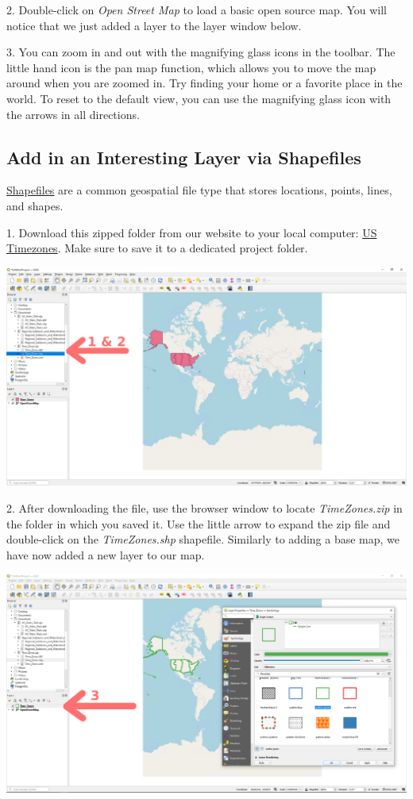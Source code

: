 \documentclass[oneside,a4paper,11pt,explicit]{book}
\begin{document}
2. Double-click on \textit{Open Street Map} to load a basic open source map. You will notice that we just added a layer to the layer window below.

3. You can zoom in and out with the magnifying glass icons in the toolbar. The little hand icon is the pan map function, which allows you to move the map around when you are zoomed in. Try finding your home or a favorite place in the world. To reset to the default view, you can use the magnifying glass icon with the arrows in all directions. 

\subsection{Add in an Interesting Layer via Shapefiles}

\href{https://en.wikipedia.org/wiki/Shapefile}{Shapefiles} are a common geospatial file type that stores locations, points, lines, and shapes.

1. Download this zipped folder from our website to your local computer:  \href{https://jeremydforsythe.github.io/icecream-tutorials/Tutorial2_MakingBasicMapsInQGIS/Time_Zones.zip}{US Timezones}. Make sure to save it to a dedicated project folder.

\centerline{\includegraphics[width=\textwidth]{TimeZones.png}}

2. After downloading the file, use the browser window to locate \textit{Time\textunderscore Zones.zip} in the folder in which you saved it. Use the little arrow to expand the zip file and double-click on the \textit{Time\textunderscore Zones.shp} shapefile. Similarly to adding a base map, we have now added a new layer to our map.

\centerline{\includegraphics[width=\textwidth]{TimeZoneSymbol.png}}
\end{document}
